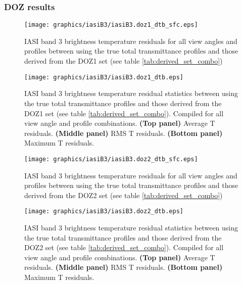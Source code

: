 \subsubsection{DOZ results}
\begin{figure}[htp]
  \centering
  \texttt{[image: graphics/iasiB3/iasiB3.doz1\_dtb\_sfc.eps]}
  \caption{IASI band 3 brightness temperature residuals for all view angles and profiles between using the true total transmittance profiles and those derived from the DOZ1 set (see table \ref{tab:derived_set_combo})}
  \label{fig:iasiB3.doz1_dtb_sfc}
  \vspace{1em}
  \texttt{[image: graphics/iasiB3/iasiB3.doz1\_dtb.eps]}
  \caption{IASI band 3 brightness temperature residual statistics between using the true total transmittance profiles and those derived from the DOZ1 set (see table \ref{tab:derived_set_combo}). Compiled for all view angle and profile combinations. \textbf{(Top panel)} Average T residuals. \textbf{(Middle panel)} RMS T residuals. \textbf{(Bottom panel)} Maximum T residuals.}
  \label{fig:iasiB3.doz1_dtb}
\end{figure}

\begin{figure}[htp]
  \centering
  \texttt{[image: graphics/iasiB3/iasiB3.doz2\_dtb\_sfc.eps]}
  \caption{IASI band 3 brightness temperature residuals for all view angles and profiles between using the true total transmittance profiles and those derived from the DOZ2 set (see table \ref{tab:derived_set_combo})}
  \label{fig:iasiB3.doz2_dtb_sfc}
  \vspace{1em}
  \texttt{[image: graphics/iasiB3/iasiB3.doz2\_dtb.eps]}
  \caption{IASI band 3 brightness temperature residual statistics between using the true total transmittance profiles and those derived from the DOZ2 set (see table \ref{tab:derived_set_combo}). Compiled for all view angle and profile combinations. \textbf{(Top panel)} Average T residuals. \textbf{(Middle panel)} RMS T residuals. \textbf{(Bottom panel)} Maximum T residuals.}
  \label{fig:iasiB3.doz2_dtb}
\end{figure}

